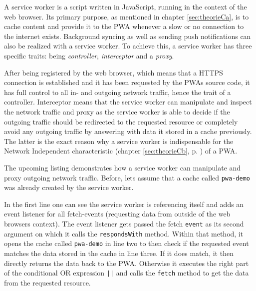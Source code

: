 A service worker is a script written in JavaScript, running in the context of the web browser. Its primary purpose, as mentioned in chapter \ref{sec:theorieCa}, is to cache content and provide it to the PWA whenever a slow or no connection to the internet exists. Background syncing as well as sending push notifications can also be realized with a service worker. To achieve this, a service worker has three specific traits: being \textit{controller}, \textit{interceptor} and a \textit{proxy}. \cite[p. 176]{liebelProgressiveWebApps2019}

After being registered by the web browser, which means that a HTTPS connection is established and it has been requested by the PWAs source code, it has full control to all in- and outgoing network traffic, hence the trait of a controller. Interceptor means that the service worker can manipulate and inspect the network traffic and proxy as the service worker is able to decide if the outgoing traffic should be redirected to the requested resource or completely avoid any outgoing traffic by answering with data it stored in a cache previously. The latter is the exact reason why a service worker is indispensable for the Network Independent characteristic (chapter \ref{sec:theorieCb}, p. \pageref{sec:theorieCb}) of a PWA. \cite[p. 176-177]{liebelProgressiveWebApps2019}

The upcoming listing demonstrates how a service worker can manipulate and proxy outgoing network traffic. Before, lets assume that a cache called \texttt{pwa-demo} was already created by the service worker.

\begin{center}
	\begin{minipage}{\textwidth}
		
	\end{minipage}
\end{center}

In the first line one can see the service worker is referencing itself and adds an event listener for all fetch-events (requesting data from outside of the web browsers context). The event listener gets passed the fetch \texttt{event} as its second argument on which it calls the \texttt{respondsWith} method. Within that method, it opens the cache called \texttt{pwa-demo} in line two to then check if the requested event matches the data stored in the cache in line three. If it does match, it then directly returns the data back to the PWA. Otherwise it executes the right part of the conditional OR expression \texttt{||} and calls the \texttt{fetch} method to get the data from the requested resource. \cite[p. 60]{liebelProgressiveWebApps2019}

